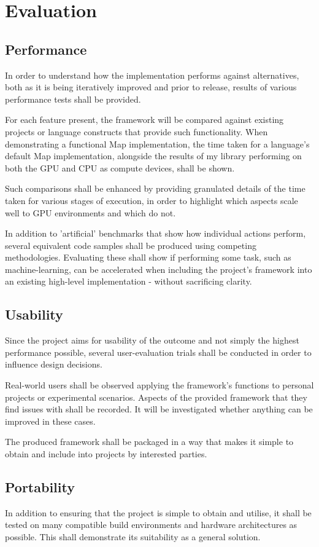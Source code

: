 \section{Evaluation}
\subsection{Performance}
In order to understand how the implementation performs against alternatives, both as it is being iteratively improved and prior to release, results of various performance tests shall be provided.

For each feature present, the framework will be compared against existing projects or language constructs that provide such functionality. When demonstrating a functional Map implementation, the time taken for a language's default Map implementation, alongside the results of my library performing on both the GPU and CPU as compute devices, shall be shown.

Such comparisons shall be enhanced by providing granulated details of the time taken for various stages of execution, in order to highlight which aspects scale well to GPU environments and which do not.

In addition to 'artificial' benchmarks that show how individual actions perform, several equivalent code samples shall be produced using competing methodologies. Evaluating these shall show if performing some task, such as machine-learning, can be accelerated when including the project's framework into an existing high-level implementation - without sacrificing clarity.
\subsection{Usability}
Since the project aims for usability of the outcome and not simply the highest performance possible, several user-evaluation trials shall be conducted in order to influence design decisions.

Real-world users shall be observed applying the framework's functions to personal projects or experimental scenarios. Aspects of the provided framework that they find issues with shall be recorded. It will be investigated whether anything can be improved in these cases.

The produced framework shall be packaged in a way that makes it simple to obtain and include into projects by interested parties.
\subsection{Portability}
In addition to ensuring that the project is simple to obtain and utilise, it shall be tested on many compatible build environments and hardware architectures as possible. This shall demonstrate its suitability as a general solution.
